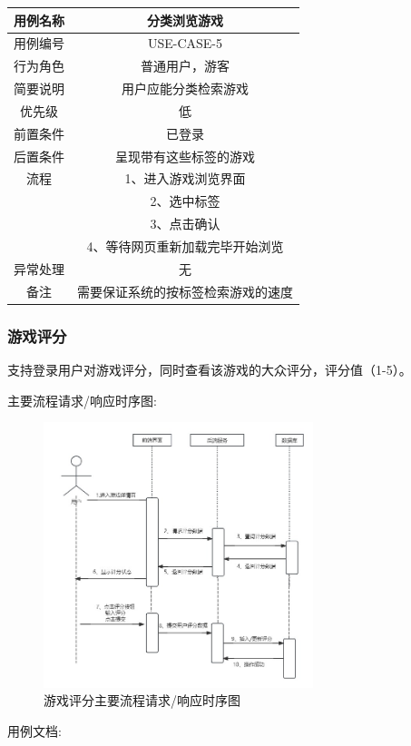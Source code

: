 \documentclass[12pt]{ctexart} %
\begin{document}
\begin{tabular}{|c|c|}
  \hline
  用例名称& 分类浏览游戏\\
  \hline
  用例编号 & USE-CASE-5\\
  \hline
  行为角色 & 普通用户，游客\\
  \hline
  简要说明 & 用户应能分类检索游戏\\
  \hline
  优先级 & 低\\
  \hline
  前置条件 & 已登录\\
  \hline
  后置条件 & 呈现带有这些标签的游戏\\
  \hline
  流程 & 1、进入游戏浏览界面\\
       & 2、选中标签\\
       & 3、点击确认\\
       & 4、等待网页重新加载完毕开始浏览\\
  \hline
  异常处理 & 无\\
  \hline
  备注 & 需要保证系统的按标签检索游戏的速度\\
  \hline
\end{tabular}

\subsubsection{游戏评分}
支持登录用户对游戏评分，同时查看该游戏的大众评分，评分值（1-5）。

主要流程请求/响应时序图:
\begin{figure}[ht]
  \centering
  \includegraphics[width=0.7\textwidth]{yongli6.jpg}
  \caption{游戏评分主要流程请求/响应时序图}
\end{figure}
用例文档:
\end{document}
